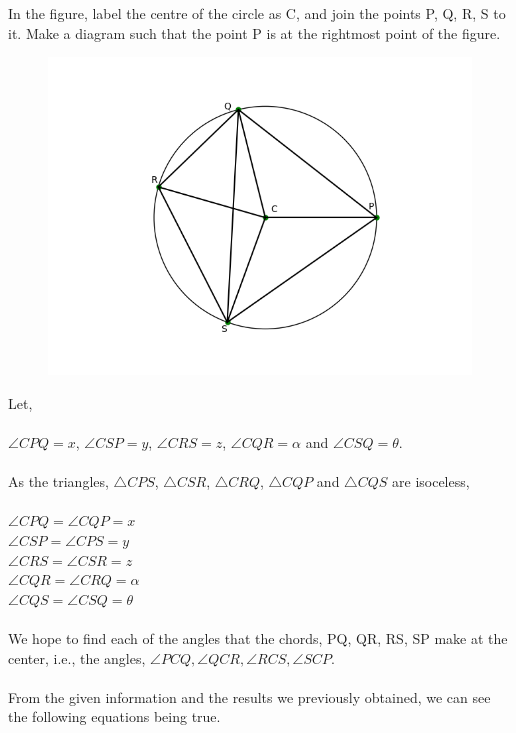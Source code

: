 \documentclass[journal,12pt,twocolumn]{IEEEtran}
\begin{document}
In the figure, label the centre of the circle as C, and join the points P, Q, R, S to it. Make a diagram such that the point P is at the rightmost point of the figure. \\
\begin{figure}[ht]
    \centering
    \includegraphics[scale = 0.5]{figs/pre_cnstrct_fig1.png}
    \end{figure}
\newpage
Let,\\\\
$\angle CPQ = x$, $\angle CSP = y$, $\angle CRS = z$, $\angle CQR = \alpha$ and $\angle CSQ = \theta .$\\\\
As the triangles, $\triangle CPS$, $\triangle CSR$, $\triangle CRQ$, $\triangle CQP$ and $\triangle CQS$ are isoceless,\\\\
$\angle CPQ = \angle CQP = x$\\
$\angle CSP = \angle CPS = y$\\
$\angle CRS = \angle CSR = z$\\
$\angle CQR = \angle CRQ = \alpha$\\
$\angle CQS = \angle CSQ = \theta$\\\\
We hope to find each of the angles that the chords, PQ, QR, RS, SP make at the center, i.e., the angles, $\angle PCQ, \angle QCR, \angle RCS, \angle SCP$.\\\\
From the given information and the results we previously obtained, we can see the following equations being true.
\end{document}

